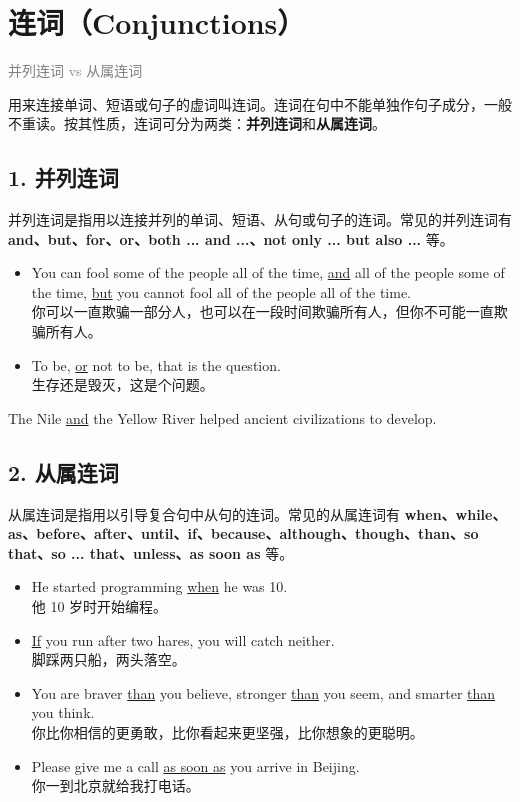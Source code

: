 \documentclass[11pt,a4paper]{ctexart}
\begin{document}
\section{连词（Conjunctions）}
\noindent\textcolor{gray}{并列连词 vs 从属连词}\par\smallskip
用来连接单词、短语或句子的虚词叫连词。连词在句中不能单独作句子成分，一般不重读。按其性质，连词可分为两类：\textbf{并列连词}和\textbf{从属连词}。

\subsection*{1. 并列连词}

并列连词是指用以连接并列的单词、短语、从句或句子的连词。常见的并列连词有 \textbf{and、but、for、or、both ... and ...、not only ... but also ...} 等。

\begin{itemize}[leftmargin=1.4em]
\item You can fool some of the people all of the time, \underline{and} all of the people some of the time, \underline{but} you cannot fool all of the people all of the time.\\ 你可以一直欺骗一部分人，也可以在一段时间欺骗所有人，但你不可能一直欺骗所有人。
\item To be, \underline{or} not to be, that is the question.\\ 生存还是毁灭，这是个问题。
\end{itemize}

The Nile \underline{and} the Yellow River helped ancient civilizations to develop.

\subsection*{2. 从属连词}

从属连词是指用以引导复合句中从句的连词。常见的从属连词有 \textbf{when、while、as、before、after、until、if、because、although、though、than、so that、so ... that、unless、as soon as} 等。

\begin{itemize}[leftmargin=1.4em]
\item He started programming \underline{when} he was 10.\\ 他 10 岁时开始编程。
\item \underline{If} you run after two hares, you will catch neither.\\ 脚踩两只船，两头落空。
\item You are braver \underline{than} you believe, stronger \underline{than} you seem, and smarter \underline{than} you think.\\ 你比你相信的更勇敢，比你看起来更坚强，比你想象的更聪明。
\item Please give me a call \underline{as soon as} you arrive in Beijing.\\ 你一到北京就给我打电话。
\end{itemize}
\end{document}
